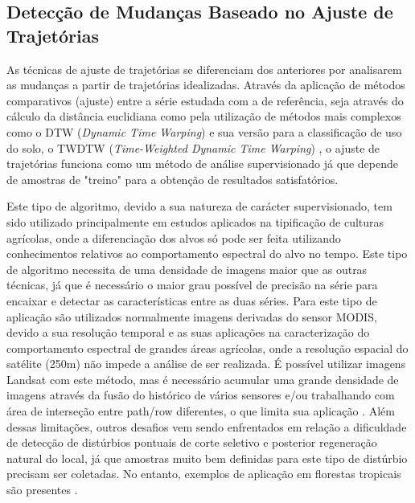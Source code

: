 \documentclass[12pt,a4paper]{article}
\begin{document}
\subsection{Detecção de Mudanças Baseado no Ajuste de Trajetórias}
\hspace{13pt} As técnicas de ajuste de trajetórias se diferenciam dos anteriores por analisarem as mudanças a partir de trajetórias idealizadas. Através da aplicação de métodos comparativos (ajuste) entre a série estudada com a de referência, seja através do cálculo da distância euclidiana como pela utilização de métodos mais complexos como o DTW (\textit{Dynamic Time Warping}) \citep{VELICHKO1970223, SakoeChiba71, Berndt1994} e sua versão para a classificação de uso do solo, o TWDTW (\textit{Time-Weighted Dynamic Time Warping}) \citep{Maus2016, Maus2019}, o ajuste de trajetórias funciona como um método de análise supervisionado já que depende de amostras de "treino" para a obtenção de resultados satisfatórios.

Este tipo de algoritmo, devido a sua natureza de carácter supervisionado, tem sido utilizado principalmente em estudos aplicados na tipificação de culturas agrícolas, onde a diferenciação dos alvos só pode ser feita utilizando conhecimentos relativos ao comportamento espectral do alvo no tempo. Este tipo de algoritmo necessita de uma densidade de imagens maior que as outras técnicas, já que é necessário o maior grau possível de precisão na série para encaixar e detectar as características entre as duas séries. Para este tipo de aplicação são utilizados normalmente imagens derivadas do sensor MODIS, devido a sua resolução temporal e as suas aplicações na caracterização do comportamento espectral de grandes áreas agrícolas, onde a resolução espacial do satélite (250m) não impede a análise de ser realizada. É possível utilizar imagens Landsat com este método, mas é necessário acumular uma grande densidade de imagens através da fusão do histórico de vários sensores e/ou trabalhando com área de interseção entre path/row diferentes, o que limita sua aplicação \citep{Bendini2016}. Além dessas limitações, outros desafios vem sendo enfrentados em relação a dificuldade de detecção de distúrbios pontuais de corte seletivo e posterior regeneração natural do local, já que amostras muito bem definidas para este tipo de distúrbio precisam ser coletadas. No entanto, exemplos de aplicação em florestas tropicais são presentes \citep{Hirschmugl2013, KENNEDY2007370}.
\end{document}
